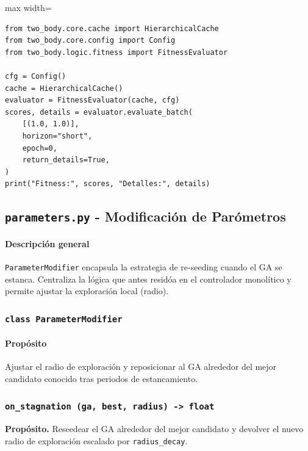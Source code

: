 \begin{listing}[H]
\caption{Ejemplo de evaluación en lote}
\begin{adjustbox}{max width=\textwidth}
\begin{minipage}{\textwidth}
\begin{verbatim}
from two_body.core.cache import HierarchicalCache
from two_body.core.config import Config
from two_body.logic.fitness import FitnessEvaluator

cfg = Config()
cache = HierarchicalCache()
evaluator = FitnessEvaluator(cache, cfg)
scores, details = evaluator.evaluate_batch(
    [(1.0, 1.0)],
    horizon="short",
    epoch=0,
    return_details=True,
)
print("Fitness:", scores, "Detalles:", details)
\end{verbatim}
\end{minipage}
\end{adjustbox}
\end{listing}

\subsection{\texttt{parameters.py} \-- Modificación de Parómetros}
\paragraph{Descripción general}
\texttt{ParameterModifier} encapsula la estrategia de re-seeding cuando el GA se estanca. Centraliza la lógica que antes residóa en el controlador monolítico y permite ajustar la exploración local (radio).

\subsubsection{\texttt{class ParameterModifier}}
\paragraph{Propósito} Ajustar el radio de exploración y reposicionar al GA alrededor del mejor candidato conocido tras periodos de estancamiento.

\subsubsection*{\texttt{on\_stagnation~(ga, best, radius) -> float}}
\textbf{Propósito.} Reseedear el GA alrededor del mejor candidato y devolver el nuevo radio de exploración escalado por \texttt{radius\_decay}.

